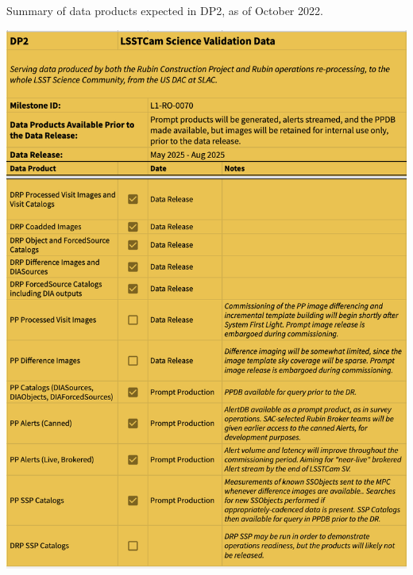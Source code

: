 \begin{table}
\caption{Summary of data products expected in DP2, as of October 2022.}
\label{tab:dp-two-products}
\includegraphics[width=\linewidth]{figures/DP2-products}
\end{table}

